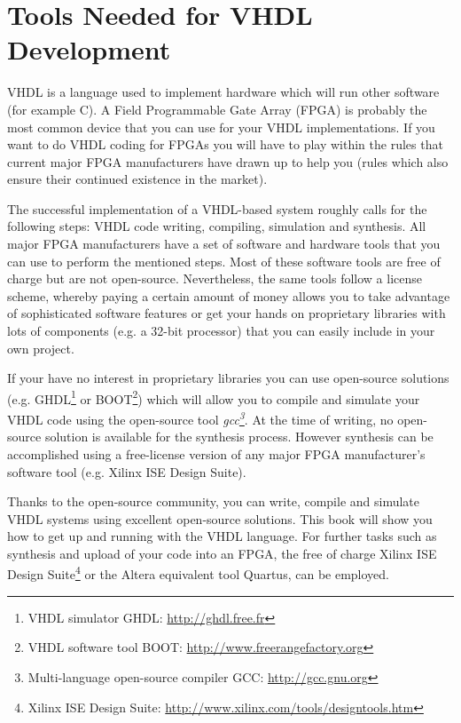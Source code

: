 \section{Tools Needed for VHDL Development}
VHDL is a language used to implement hardware which will run other software (for example C). A Field Programmable Gate Array (FPGA) is probably the most common device that you can use for your VHDL implementations. If you want to do VHDL coding for FPGAs you will have to play within the rules that current major FPGA manufacturers have drawn up to help you (rules which also ensure their continued existence in the market).

The successful implementation of a VHDL-based system roughly calls for the following steps: VHDL code writing, compiling, simulation and synthesis. All major FPGA manufacturers have a set of software and hardware tools that you can use to perform the mentioned steps. Most of these software tools are free of charge but are not open-source. Nevertheless, the same tools follow a license scheme, whereby paying a certain amount of money allows you to take advantage of sophisticated software features or get your hands on proprietary libraries with lots of components (e.g. a 32-bit processor) that you can easily include in your own project. 

If your have no interest in proprietary libraries you can use open-source solutions (e.g. GHDL\footnote{VHDL simulator GHDL: {\footnotesize\url{http://ghdl.free.fr}}} or BOOT\footnote{VHDL software tool BOOT: {\footnotesize\url{http://www.freerangefactory.org}}}) which will allow you to compile and simulate your VHDL code using the open-source tool \textit{gcc\footnote{Multi-language open-source compiler GCC: {\footnotesize\url{http://gcc.gnu.org}}}}. At the time of writing, no open-source solution is available for the synthesis process. However synthesis can be accomplished using a free-license version of any major FPGA manufacturer's software tool (e.g. Xilinx ISE Design Suite).

Thanks to the open-source community, you can write, compile and simulate VHDL systems using excellent open-source solutions. This book will show you how to get up and running with the VHDL language. For further tasks such as synthesis and upload of your code into an FPGA, the free of charge Xilinx ISE Design Suite\footnote{Xilinx ISE Design Suite: {\footnotesize\url{http://www.xilinx.com/tools/designtools.htm}}} or the Altera equivalent tool Quartus, can be employed.

 

